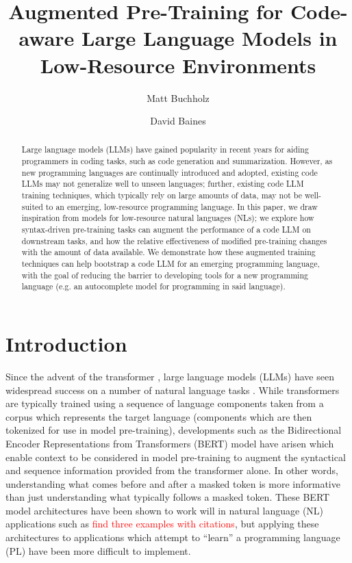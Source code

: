 \documentclass[acmlarge]{acmart}
\title{Augmented Pre-Training for Code-aware Large Language Models in Low-Resource Environments}
\author{Matt Buchholz}
\affiliation{%
  \institution{University of Colorado - Boulder}
  }
\author{David Baines}
\affiliation{%
  \institution{University of Colorado - Boulder}
  }
\begin{document}
\maketitle
\begin{abstract}
Large language models (LLMs) have gained popularity in recent years for aiding programmers in coding tasks, such as code generation and summarization. However, as new programming languages are continually introduced and adopted, existing code LLMs may not generalize well to unseen languages; further, existing code LLM training techniques, which typically rely on large amounts of data, may not be well-suited to an emerging, low-resource programming language. In this paper, we draw inspiration from models for low-resource natural languages (NLs); we explore how syntax-driven pre-training tasks can augment the performance of a code LLM on downstream tasks, and how the relative effectiveness of modified pre-training changes with the amount of data available. We demonstrate how these augmented training techniques can help bootstrap a code LLM for an emerging programming language, with the goal of reducing the barrier to developing tools for a new programming language (e.g. an autocomplete model for programming in said language).
\end{abstract}

\section{Introduction}

Since the advent of the transformer \cite{transformer}, large language models (LLMs) have seen widespread success on a number of natural language tasks \cite{llm-survey}. While transformers are typically trained using a sequence of language components taken from a corpus which represents the target language (components which are then tokenized for use in model pre-training), developments such as the Bidirectional Encoder Representations from Transformers (BERT) model \cite{BERT} have arisen which enable context to be considered in model pre-training to augment the syntactical and sequence information provided from the transformer alone. In other words, understanding what comes before and after a masked token is more informative than just understanding what typically follows a masked token. These BERT model architectures have been shown to work will in natural language (NL) applications such as \textcolor{red}{find three examples with citations}, but applying these architectures to applications which attempt to ``learn'' a programming language (PL) have been more difficult to implement.
\end{document}
